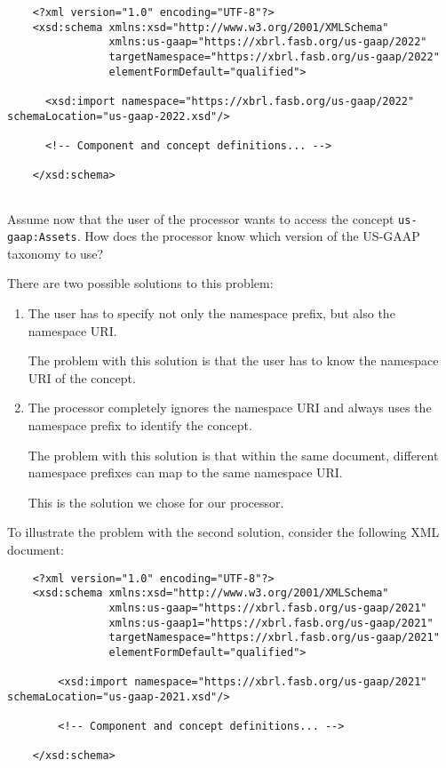 \begin{lstlisting}
    <?xml version="1.0" encoding="UTF-8"?>
    <xsd:schema xmlns:xsd="http://www.w3.org/2001/XMLSchema"
                xmlns:us-gaap="https://xbrl.fasb.org/us-gaap/2022"
                targetNamespace="https://xbrl.fasb.org/us-gaap/2022"
                elementFormDefault="qualified">
    
      <xsd:import namespace="https://xbrl.fasb.org/us-gaap/2022" schemaLocation="us-gaap-2022.xsd"/>
    
      <!-- Component and concept definitions... -->
    
    </xsd:schema>
    

\end{lstlisting}

Assume now that the user of the processor wants to access the concept \texttt{us-gaap:Assets}. 
How does the processor know which version of the US-GAAP taxonomy to use?

There are two possible solutions to this problem:

\begin{enumerate}
    \item The user has to specify not only the namespace prefix, but also the namespace URI. 
    
    The problem with this solution is that the user has to know the namespace URI of the concept.
    \item The processor completely ignores the namespace URI and always uses the namespace prefix to identify the concept. 
    
    The problem with this solution is that within the same document, different namespace prefixes can map to the same namespace URI.

    This is the solution we chose for our processor. 
\end{enumerate}

To illustrate the problem with the second solution, consider the following XML document:

\begin{lstlisting}
    <?xml version="1.0" encoding="UTF-8"?>
    <xsd:schema xmlns:xsd="http://www.w3.org/2001/XMLSchema"
                xmlns:us-gaap="https://xbrl.fasb.org/us-gaap/2021"
                xmlns:us-gaap1="https://xbrl.fasb.org/us-gaap/2021"
                targetNamespace="https://xbrl.fasb.org/us-gaap/2021"
                elementFormDefault="qualified">

        <xsd:import namespace="https://xbrl.fasb.org/us-gaap/2021" schemaLocation="us-gaap-2021.xsd"/>

        <!-- Component and concept definitions... -->

    </xsd:schema>

\end{lstlisting}

